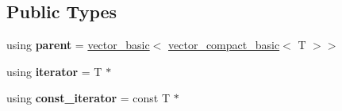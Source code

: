 \subsection*{Public Types}
\begin{DoxyCompactItemize}
\item 
using {\bfseries parent} = \hyperlink{classmalgo_1_1vector__basic}{vector\+\_\+basic}$<$ \hyperlink{classmalgo_1_1vector__compact__basic}{vector\+\_\+compact\+\_\+basic}$<$ T $>$$>$\hypertarget{classmalgo_1_1vector__compact__basic_a7e3536c1655069a477719b5fd0d15a0e}{}\label{classmalgo_1_1vector__compact__basic_a7e3536c1655069a477719b5fd0d15a0e}

\item 
using {\bfseries iterator} = T $\ast$\hypertarget{classmalgo_1_1vector__compact__basic_aecfd22d858fc59159bd958bf9e5fed10}{}\label{classmalgo_1_1vector__compact__basic_aecfd22d858fc59159bd958bf9e5fed10}

\item 
using {\bfseries const\+\_\+iterator} = const T $\ast$\hypertarget{classmalgo_1_1vector__compact__basic_a074900c0efedec86a3d3123fa849dcec}{}\label{classmalgo_1_1vector__compact__basic_a074900c0efedec86a3d3123fa849dcec}

\end{DoxyCompactItemize}
